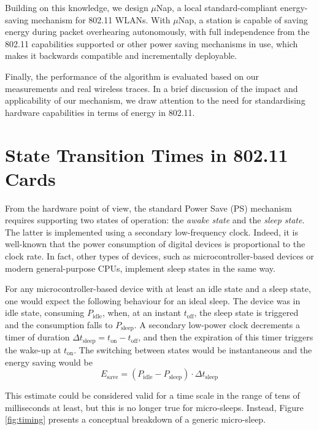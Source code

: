 \documentclass[twoside,nohyper]{tufte-book}
\theoremstyle{definition}
\theoremstyle{definition}
\theoremstyle{definition}
\theoremstyle{remark}
\begin{document}
Building on this knowledge, we design \(\mu\)Nap, a local
standard-compliant energy-saving mechanism for 802.11 WLANs. With
\(\mu\)Nap, a station is capable of saving energy during packet
overhearing autonomously, with full independence from the 802.11
capabilities supported or other power saving mechanisms in use, which
makes it backwards compatible and incrementally deployable.

Finally, the performance of the algorithm is evaluated based on our
measurements and real wireless traces. In a brief discussion of the
impact and applicability of our mechanism, we draw attention to the need
for standardising hardware capabilities in terms of energy in 802.11.

\section{State Transition Times in 802.11
Cards}\label{state-transition-times}

From the hardware point of view, the standard Power Save (PS) mechanism
requires supporting two states of operation: the \emph{awake state} and
the \emph{sleep state}. The latter is implemented using a secondary
low-frequency clock. Indeed, it is well-known that the power consumption
of digital devices is proportional to the clock
rate\cite[0pt]{Zhang2012}.
In fact, other types of devices, such as microcontroller-based devices
or modern general-purpose CPUs, implement sleep states in the same way.

For any microcontroller-based device with at least an idle state and a
sleep state, one would expect the following behaviour for an ideal
sleep. The device was in idle state, consuming \(P_\mathrm{idle}\),
when, at an instant \(t_\mathrm{off}\), the sleep state is triggered and
the consumption falls to \(P_\mathrm{sleep}\). A secondary low-power
clock decrements a timer of duration
\(\Delta t_\mathrm{sleep} = t_\mathrm{on} - t_\mathrm{off}\), and then
the expiration of this timer triggers the wake-up at \(t_\mathrm{on}\).
The switching between states would be instantaneous and the energy
saving would be
%
\begin{equation}
 E_\mathrm{save} = (P_\mathrm{idle} - P_\mathrm{sleep}) \cdot \Delta t_\mathrm{sleep}
 \label{eq:idealsleep}
\end{equation}
%

This estimate could be considered valid for a time scale in the range of
tens of milliseconds at least, but this is no longer true for
micro-sleeps. Instead, Figure \ref{fig:timing} presents a conceptual
breakdown of a generic micro-sleep.
\end{document}
